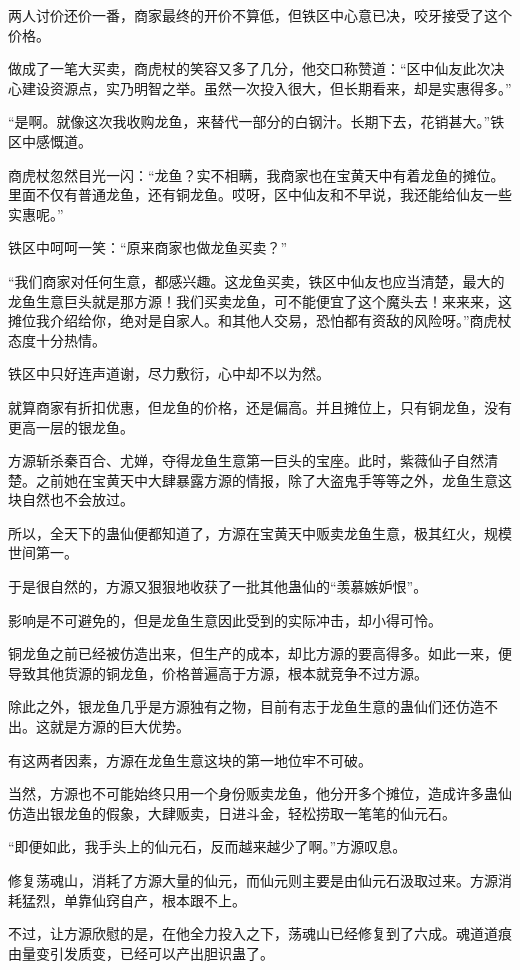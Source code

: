 \begin{this_body}
两人讨价还价一番，商家最终的开价不算低，但铁区中心意已决，咬牙接受了这个价格。

做成了一笔大买卖，商虎杖的笑容又多了几分，他交口称赞道：“区中仙友此次决心建设资源点，实乃明智之举。虽然一次投入很大，但长期看来，却是实惠得多。”

“是啊。就像这次我收购龙鱼，来替代一部分的白钢汁。长期下去，花销甚大。”铁区中感慨道。

商虎杖忽然目光一闪：“龙鱼？实不相瞒，我商家也在宝黄天中有着龙鱼的摊位。里面不仅有普通龙鱼，还有铜龙鱼。哎呀，区中仙友和不早说，我还能给仙友一些实惠呢。”

铁区中呵呵一笑：“原来商家也做龙鱼买卖？”

“我们商家对任何生意，都感兴趣。这龙鱼买卖，铁区中仙友也应当清楚，最大的龙鱼生意巨头就是那方源！我们买卖龙鱼，可不能便宜了这个魔头去！来来来，这摊位我介绍给你，绝对是自家人。和其他人交易，恐怕都有资敌的风险呀。”商虎杖态度十分热情。

铁区中只好连声道谢，尽力敷衍，心中却不以为然。

就算商家有折扣优惠，但龙鱼的价格，还是偏高。并且摊位上，只有铜龙鱼，没有更高一层的银龙鱼。

方源斩杀秦百合、尤婵，夺得龙鱼生意第一巨头的宝座。此时，紫薇仙子自然清楚。之前她在宝黄天中大肆暴露方源的情报，除了大盗鬼手等等之外，龙鱼生意这块自然也不会放过。

所以，全天下的蛊仙便都知道了，方源在宝黄天中贩卖龙鱼生意，极其红火，规模世间第一。

于是很自然的，方源又狠狠地收获了一批其他蛊仙的“羡慕嫉妒恨”。

影响是不可避免的，但是龙鱼生意因此受到的实际冲击，却小得可怜。

铜龙鱼之前已经被仿造出来，但生产的成本，却比方源的要高得多。如此一来，便导致其他货源的铜龙鱼，价格普遍高于方源，根本就竞争不过方源。

除此之外，银龙鱼几乎是方源独有之物，目前有志于龙鱼生意的蛊仙们还仿造不出。这就是方源的巨大优势。

有这两者因素，方源在龙鱼生意这块的第一地位牢不可破。

当然，方源也不可能始终只用一个身份贩卖龙鱼，他分开多个摊位，造成许多蛊仙仿造出银龙鱼的假象，大肆贩卖，日进斗金，轻松捞取一笔笔的仙元石。

“即便如此，我手头上的仙元石，反而越来越少了啊。”方源叹息。

修复荡魂山，消耗了方源大量的仙元，而仙元则主要是由仙元石汲取过来。方源消耗猛烈，单靠仙窍自产，根本跟不上。

不过，让方源欣慰的是，在他全力投入之下，荡魂山已经修复到了六成。魂道道痕由量变引发质变，已经可以产出胆识蛊了。


\end{this_body}
